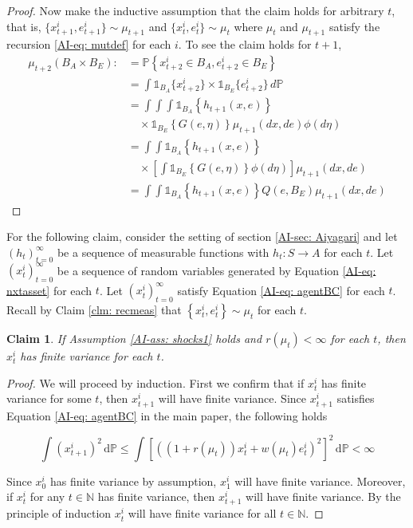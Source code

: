 \documentclass[12pt]{ectaart}
\newcommand{\1}{\mathbbm 1}
\theoremstyle{plain}
\newtheorem{claim}{Claim}[section]
\theoremstyle{definition}
\begin{document}
\begin{proof}
		Now make the inductive assumption that the claim holds for arbitrary $t$, that is,  $\{x_{t+1}^{i}, e_{t+1}^{i}\}\sim \mu_{t+1}$ and $\{x_{t}^{i}, e_{t}^{i}\}\sim \mu_{t}$ where $\mu_{t}$ and $\mu_{t+1 }$ satisfy the recursion \eqref{AI-eq: mutdef} for each $i$. To see the claim holds for $t+1$, 
		\begin{align*}
		\mu_{t+2}(B_{A}\times B_{E}) \colon & = \mathbb{P}\left\{x_{t+2}^{i}\in B_{A}, e_{t+2}^{i}\in B_{E}\right\}\\
		& = \int \mathbb{1}_{B_{A}}\{x_{t+2}^{i}\}\times\mathbb{1}_{B_{E}}\{e_{t+2}^{i}\}\,d\mathbb{P}\\
		& = \int\int \int \mathbb{1}_{B_{A}}\left\{h_{t+1}(x, e)\right\}\\
		& \quad \times \mathbb{1}_{B_{E}}\left\{G(e, \eta)\right\}\mu_{t+1}(dx, de)\phi(d\eta)\\
		& = \int\int \mathbb{1}_{B_{A}}\left\{h_{t+1}(x, e)\right\}\\
		& \quad\times \left[\int \mathbb{1}_{B_{E}} \left\{G(e, \eta)\right\}\phi(d\eta)\right]\mu_{t+1}(dx, de)\\
		& = \int\int \mathbb{1}_{B_{A}}\left\{h_{t+1}(x, e)\right\} Q(e,B_{E})\mu_{t+1}(dx, de)
		\end{align*}
		
	\end{proof}
	
	
	For the following claim, consider the setting of section \ref{AI-sec: Aiyagari} and let $(h_{t})_{t=0}^{\infty}$ be a sequence of measurable functions with $h_{t}\colon S\rightarrow A$ for each $t$.  Let $(x_{t}^{i})_{t=0}^{\infty}$ be a sequence of random variables generated by Equation \eqref{AI-eq: nxtasset} for each $t$. Let $(x_{t}^{i})_{t=0}^{\infty}$ satisfy Equation \eqref{AI-eq: agentBC} for each $t$. Recall by Claim \ref{clm: recmeas} that $\left\{x_{t}^{i},e_{t}^{i}\right\}\sim \mu_{t}$ for each $t$.
	
	\begin{claim}\label{clm: finvar}
		If Assumption \ref{AI-ass: shocks1} holds  and $r(\mu_{t})< \infty$ for each $t$, then $x_{t}^{i}$ has finite variance for each $t$.
	\end{claim}
	\begin{proof}
		
		We will proceed by induction. First we confirm that if $x_{t}^{i}$ has finite variance for some $t$, then $x_{t+1}^{i}$ will have finite variance. Since $x_{t+1}^{i}$ satisfies Equation \eqref{AI-eq: agentBC} in the main paper, the following holds
		
		\begin{equation*}
		\int (x_{t+1}^{i})^{2}\, \mathrm{d}\mathbb{P} \leq \int \left[((1+r(\mu_{t}))x_{t}^{i} +w(\mu_{t})e_{t}^{i})^{2} \right]^{2}\,\mathrm{d}\mathbb{P} < \infty 
		\end{equation*}
		
		Since $x_{0}^{i}$ has finite variance by assumption, $x_{1}^{i}$ will have finite variance. Moreover, if $x_{t}^{i}$ for any $t\in \mathbb{N}$ has finite variance, then  $x_{t+1}^{i}$ will have finite variance. By the principle of induction $x_{t}^{i}$ will have finite variance for all $t\in \mathbb{N}$. 
	\end{proof}
	
\end{document}
